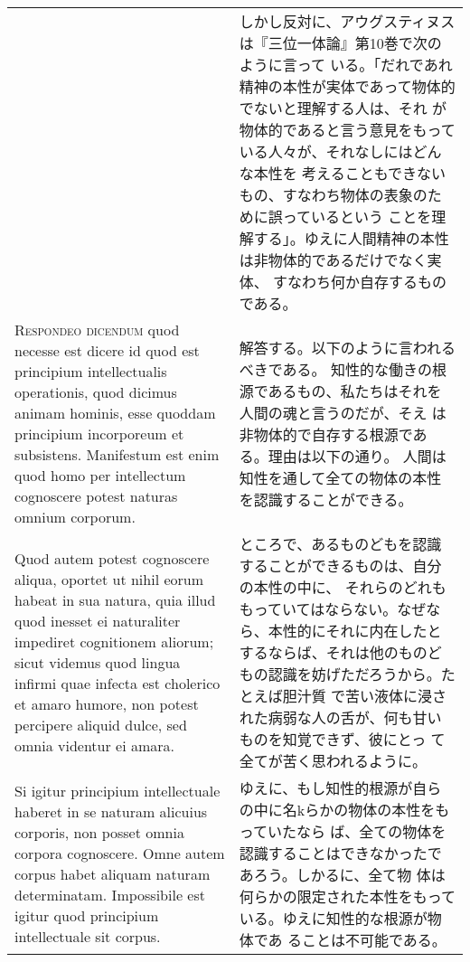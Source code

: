 \documentclass[paper=a4paper,fontsize=10pt,jafontsize=9pt,titlepage]{jlreq}
\begin{document}
\begin{longtable}{p{21em}p{21em}}
&

しかし反対に、アウグスティヌスは『三位一体論』第10巻で次のように言って
いる。「だれであれ精神の本性が実体であって物体的でないと理解する人は、それ
 が物体的であると言う意見をもっている人々が、それなしにはどんな本性を
 考えることもできないもの、すなわち物体の表象のために誤っているという
 ことを理解する」。ゆえに人間精神の本性は非物体的であるだけでなく実体、
 すなわち何か自存するものである。


\\



{\scshape Respondeo dicendum} quod necesse est dicere id quod est principium
intellectualis operationis, quod dicimus animam hominis, esse quoddam
principium incorporeum et subsistens. Manifestum est enim quod homo
per intellectum cognoscere potest naturas omnium corporum. 


&

解答する。以下のように言われるべきである。
知性的な働きの根源であるもの、私たちはそれを人間の魂と言うのだが、そえ
 は非物体的で自存する根源である。理由は以下の通り。
人間は知性を通して全ての物体の本性を認識することができる。

\\



Quod autem
potest cognoscere aliqua, oportet ut nihil eorum habeat in sua natura,
quia illud quod inesset ei naturaliter impediret cognitionem aliorum;
sicut videmus quod lingua infirmi quae infecta est cholerico et amaro
humore, non potest percipere aliquid dulce, sed omnia videntur ei
amara. 

&

ところで、あるものどもを認識することができるものは、自分の本性の中に、
それらのどれももっていてはならない。なぜなら、本性的にそれに内在したと
するならば、それは他のものどもの認識を妨げただろうから。たとえば胆汁質
 で苦い液体に浸された病弱な人の舌が、何も甘いものを知覚できず、彼にとっ
 て全てが苦く思われるように。


\\



Si igitur principium intellectuale haberet in se naturam
alicuius corporis, non posset omnia corpora cognoscere. Omne autem
corpus habet aliquam naturam determinatam. Impossibile est igitur quod
principium intellectuale sit corpus. 

&

ゆえに、もし知性的根源が自らの中に名kらかの物体の本性をもっていたなら
 ば、全ての物体を認識することはできなかったであろう。しかるに、全て物
 体は何らかの限定された本性をもっている。ゆえに知性的な根源が物体であ
 ることは不可能である。



\end{longtable}
\end{document}
